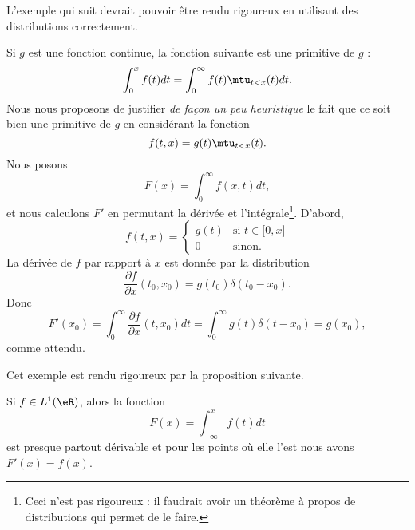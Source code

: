 L'exemple qui suit devrait pouvoir être rendu rigoureux en utilisant des distributions correctement.

\begin{example} \label{ExfYXeQg}
    Si \( g\) est une fonction continue, la fonction suivante est une primitive de \( g\) :
    \begin{equation}
        \int_0^xf(t)dt=\int_0^{\infty}f(t)\mtu_{t<x}(t)dt.
    \end{equation}
    Nous nous proposons de justifier \emph{de façon un peu heuristique} le fait que ce soit bien une primitive de \( g\) en considérant la fonction
    \begin{equation}
        f(t,x)=g(t)\mtu_{t<x}(t).
    \end{equation}
    Nous posons
    \begin{equation}
        F(x)=\int_0^{\infty}f(x,t)dt,
    \end{equation}
    et nous calculons \( F'\) en permutant la dérivée et l'intégrale\footnote{Ceci n'est pas rigoureux : il faudrait avoir un théorème à propos de distributions qui permet de le faire.}. D'abord,
    \begin{equation}
        f(t,x)=\begin{cases}
            g(t)    &   \text{si } t\in \mathopen[ 0 , x \mathclose]\\
            0    &    \text{sinon.}
        \end{cases}
    \end{equation}
    La dérivée de \( f\) par rapport à \( x\) est donnée par la distribution
    \begin{equation}
        \frac{ \partial f }{ \partial x }(t_0,x_0)=g(t_0)\delta(t_0-x_0).
    \end{equation}
    Donc
    \begin{equation}
        F'(x_0)=\int_0^{\infty}\frac{ \partial f }{ \partial x }(t,x_0)dt=\int_0^{\infty}g(t)\delta(t-x_0)=g(x_0),
    \end{equation}
    comme attendu.
\end{example}

Cet exemple est rendu rigoureux par la proposition suivante.
\begin{proposition} \label{PropJLnPpaw}
    Si \( f\in L^1(\eR)\), alors la fonction
    \begin{equation}
        F(x)=\int_{-\infty}^xf(t)dt
    \end{equation}
    est presque partout dérivable et pour les points où elle l'est nous avons \( F'(x)=f(x)\).
\end{proposition}


